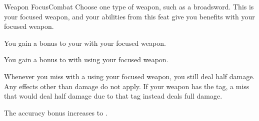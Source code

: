   \begin{feat}{Weapon Focus}{Combat}
     Choose one type of weapon, such as a broadsword.
    This is your focused weapon, and your abilities from this feat give you benefits with your focused weapon.

     You gain a  bonus to your  with your focused weapon.

     You gain a  bonus to  with  using your focused weapon.
    
     Whenever you miss with a  using your focused weapon, you still deal half damage.
    Any effects other than damage do not apply.
    If your weapon has the  tag, a miss that would deal half damage due to that tag instead deals full damage.

     The accuracy bonus increases to .
  \end{feat}

